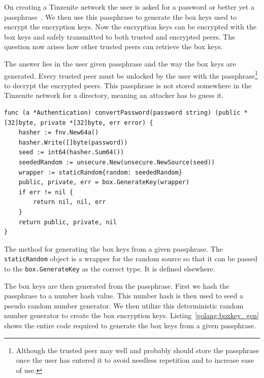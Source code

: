 On creating a Tinzenite network the user is asked for a password or better yet a passphrase~\cite{web:site:xkcd:pwd_strength}.
We then use this passphrase to generate the box keys used to encrypt the encryption keys.
Now the encryption keys can be encrypted with the box keys and safely transmitted to both trusted and encrypted peers.
The question now arises how other trusted peers can retrieve the box keys.

The answer lies in the user given passphrase and the way the box keys are generated.
Every trusted peer must be unlocked by the user with the passphrase\footnote{Although the trusted peer may well and probably should store the passphrase once the user has entered it to avoid needless repetition and to increase ease of use.} to decrypt the encrypted peers.
This passphrase is not stored somewhere in the Tinzenite network for a directory, meaning an attacker has to guess it.

\begin{listing}[htp]
    \begin{lstlisting}[language=golang,firstnumber=0]
func (a *Authentication) convertPassword(password string) (public *[32]byte, private *[32]byte, err error) {
	hasher := fnv.New64a()
	hasher.Write([]byte(password))
	seed := int64(hasher.Sum64())
	seededRandom := unsecure.New(unsecure.NewSource(seed))
	wrapper := staticRandom{random: seededRandom}
	public, private, err = box.GenerateKey(wrapper)
	if err != nil {
		return nil, nil, err
	}
	return public, private, nil
}
    \end{lstlisting}
\caption[Golang Box Key Generation]{The method for generating the box keys from a given passphrase. The \texttt{staticRandom} object is a wrapper for the random source so that it can be passed to the \texttt{box.GenerateKey} as the correct type. It is defined elsewhere.}
\label{golang:boxkey_gen}
\end{listing}

The box keys are then generated from the passphrase.
First we hash the passphrase to a number hash value.
This number hash is then used to seed a pseudo random number generator.
We then utilize this deterministic random number generator to create the box encryption keys.
Listing~\ref{golang:boxkey_gen} shows the entire code required to generate the box keys from a given passphrase.

